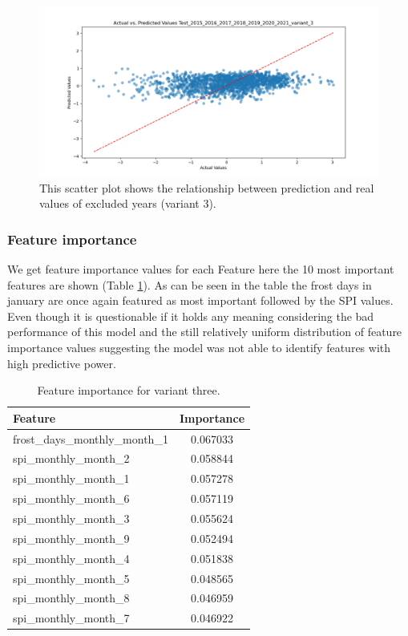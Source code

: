 \documentclass{article}
\begin{document}
\begin{figure}[H]
	\centering
	\includegraphics[width=1.0\textwidth]{./plots/scatter_Test_2015_2016_2017_2018_2019_2020_2021_variant_3.png}
	\caption{\label{fig:scatter_excluded_years_variant_3}This scatter plot shows the relationship between prediction and real values of excluded years (variant 3).}
\end{figure}
\subsubsection{Feature importance}
We get feature importance values for each Feature here the 10 most important features are shown (Table \ref{table:feature_importance_variant_3}).
As can be seen in the table the frost days in january are once again featured as most important followed by the SPI values. Even though it is questionable if it holds any meaning considering the bad performance of this model and the still relatively uniform distribution of feature importance values suggesting the model was not able to identify features with high predictive power.
\begin{table}[H]
	\centering
	\begin{tabular}{lc}
		\hline
		Feature                        & Importance \\
		\hline
		frost\_days\_monthly\_month\_1 & 0.067033   \\
		spi\_monthly\_month\_2         & 0.058844   \\
		spi\_monthly\_month\_1         & 0.057278   \\
		spi\_monthly\_month\_6         & 0.057119   \\
		spi\_monthly\_month\_3         & 0.055624   \\
		spi\_monthly\_month\_9         & 0.052494   \\
		spi\_monthly\_month\_4         & 0.051838   \\
		spi\_monthly\_month\_5         & 0.048565   \\
		spi\_monthly\_month\_8         & 0.046959   \\
		spi\_monthly\_month\_7         & 0.046922   \\
		\hline
	\end{tabular}
	\caption{\label{table:feature_importance_variant_3} Feature importance for variant three.}
\end{table}
\end{document}
